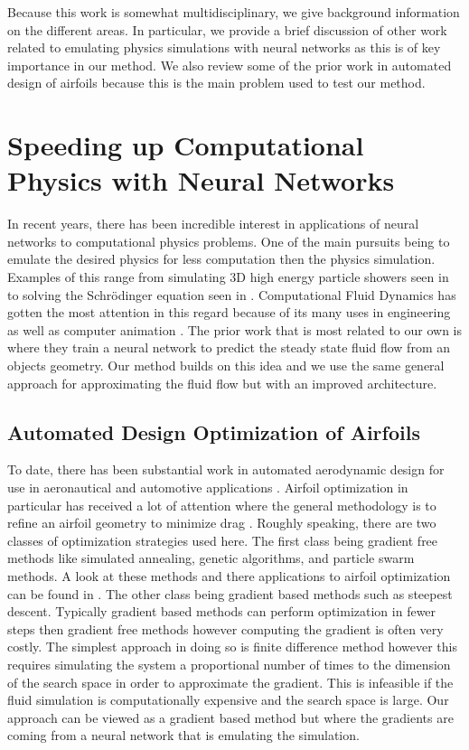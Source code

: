 \documentclass{article} %
\begin{document}
Because this work is somewhat multidisciplinary, we give background information on the different areas. In particular, we provide a brief discussion of other work related to emulating physics simulations with neural networks as this is of key importance in our method. We also review some of the prior work in automated design of airfoils because this is the main problem used to test our method.

\section{Speeding up Computational Physics with Neural Networks}

In recent years, there has been incredible interest in applications of neural networks to computational physics problems. One of the main pursuits being to emulate the desired physics for less computation then the physics simulation. Examples of this range from simulating 3D high energy particle showers seen in \citet{2017arXiv170502355P} to solving the Schrödinger equation seen in \citet{mills2017deep}. Computational Fluid Dynamics has gotten the most attention in this regard because of its many uses in engineering as well as computer animation \citep{tompson2016accelerating} \citep{2017arXiv170509036H}. The prior work that is most related to our own is \citet{guo2016convolutional} where they train a neural network to predict the steady state fluid flow from an objects geometry. Our method builds on this idea and we use the same general approach for approximating the fluid flow but with an improved architecture.

\subsection{Automated Design Optimization of Airfoils}

To date, there has been substantial work in automated aerodynamic design for use in aeronautical and automotive applications \citep{ando2010automotive} \citep{anderson2015adaptive}. Airfoil optimization in particular has received a lot of attention where the general methodology is to refine an airfoil geometry to minimize drag \citep{drela1998pros} \citep{koziel2013multi}. Roughly speaking, there are two classes of optimization strategies used here. The first class being gradient free methods like simulated annealing, genetic algorithms, and particle swarm methods. A look at these methods and there applications to airfoil optimization can be found in \citet{mukesh2012application}. The other class being gradient based methods such as steepest descent. Typically gradient based methods can perform optimization in fewer steps then gradient free methods however computing the gradient is often very costly. The simplest approach in doing so is finite difference method however this requires simulating the system a proportional number of times to the dimension of the search space in order to approximate the gradient. This is infeasible if the fluid simulation is computationally expensive and the search space is large. Our approach can be viewed as a gradient based method but where the gradients are coming from a neural network that is emulating the simulation.
\end{document}
